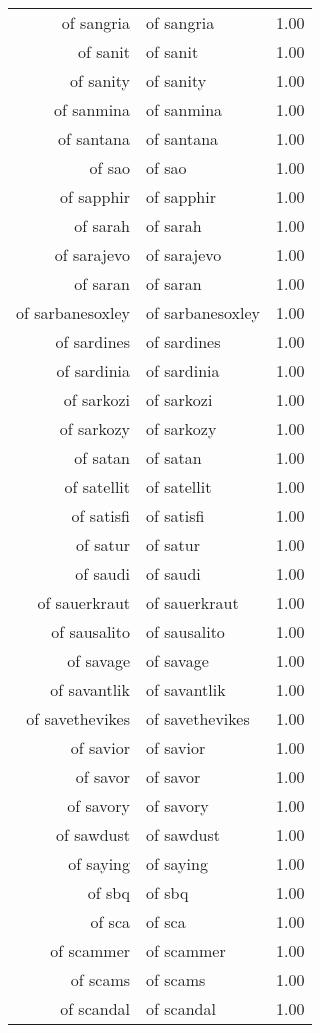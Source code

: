\begin{table}[ht]
\begin{tabular}{rlr}
  of sangria & of sangria & 1.00 \\ 
  of sanit & of sanit & 1.00 \\ 
  of sanity & of sanity & 1.00 \\ 
  of sanmina & of sanmina & 1.00 \\ 
  of santana & of santana & 1.00 \\ 
  of sao & of sao & 1.00 \\ 
  of sapphir & of sapphir & 1.00 \\ 
  of sarah & of sarah & 1.00 \\ 
  of sarajevo & of sarajevo & 1.00 \\ 
  of saran & of saran & 1.00 \\ 
  of sarbanesoxley & of sarbanesoxley & 1.00 \\ 
  of sardines & of sardines & 1.00 \\ 
  of sardinia & of sardinia & 1.00 \\ 
  of sarkozi & of sarkozi & 1.00 \\ 
  of sarkozy & of sarkozy & 1.00 \\ 
  of satan & of satan & 1.00 \\ 
  of satellit & of satellit & 1.00 \\ 
  of satisfi & of satisfi & 1.00 \\ 
  of satur & of satur & 1.00 \\ 
  of saudi & of saudi & 1.00 \\ 
  of sauerkraut & of sauerkraut & 1.00 \\ 
  of sausalito & of sausalito & 1.00 \\ 
  of savage & of savage & 1.00 \\ 
  of savantlik & of savantlik & 1.00 \\ 
  of savethevikes & of savethevikes & 1.00 \\ 
  of savior & of savior & 1.00 \\ 
  of savor & of savor & 1.00 \\ 
  of savory & of savory & 1.00 \\ 
  of sawdust & of sawdust & 1.00 \\ 
  of saying & of saying & 1.00 \\ 
  of sbq & of sbq & 1.00 \\ 
  of sca & of sca & 1.00 \\ 
  of scammer & of scammer & 1.00 \\ 
  of scams & of scams & 1.00 \\ 
  of scandal & of scandal & 1.00 \\ 

\end{tabular}
\end{table}
